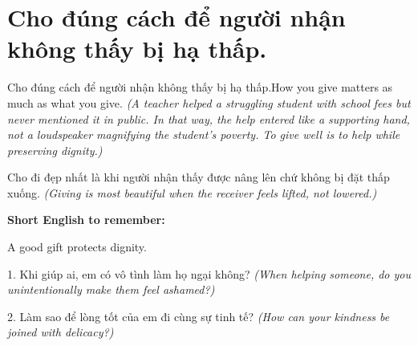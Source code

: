 \section{Cho đúng cách để người nhận không thấy bị hạ thấp.}
\begin{truyen}{Cho đúng cách để người nhận không thấy bị hạ thấp.}{How you give matters as much as what you give.}
\textit{(A teacher helped a struggling student with school fees but never mentioned it in public. In that way, the help entered like a supporting hand, not a loudspeaker magnifying the student's poverty. To give well is to help while preserving dignity.)}
\end{truyen}
\begin{baihoc}
Cho đi đẹp nhất là khi người nhận thấy được nâng lên chứ không bị đặt thấp xuống.
\textit{(Giving is most beautiful when the receiver feels lifted, not lowered.)}
\end{baihoc}
\begin{ghinhoanh}
\textbf{Short English to remember:}

A good gift protects dignity.
\end{ghinhoanh}
\begin{tuhocnhanh}
1. Khi giúp ai, em có vô tình làm họ ngại không? \textit{(When helping someone, do you unintentionally make them feel ashamed?)}

2. Làm sao để lòng tốt của em đi cùng sự tinh tế? \textit{(How can your kindness be joined with delicacy?)}
\end{tuhocnhanh}
\ngancach
